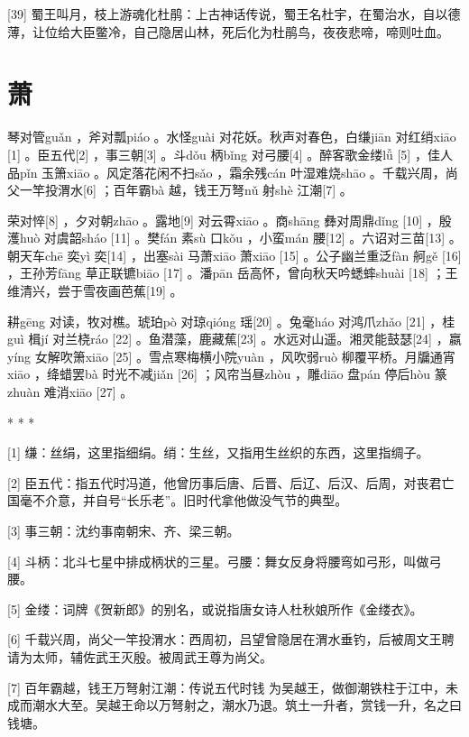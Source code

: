 \documentclass[12pt,UTF8]{ctexbook}
\begin{document}
[39] 蜀王叫月，枝上游魂化杜鹃：上古神话传说，蜀王名杜宇，在蜀治水，自以德薄，让位给大臣鳖冷，自己隐居山林，死后化为杜鹃鸟，夜夜悲啼，啼则吐血。





\chapter{萧}


琴对管guǎn ，斧对瓢piáo 。水怪guài 对花妖。秋声对春色，白缣jiān 对红绡xiāo [1] 。臣五代[2] ，事三朝[3] 。斗dǒu 柄bǐng 对弓腰[4] 。醉客歌金缕lǚ [5] ，佳人品pǐn 玉箫xiāo 。风定落花闲不扫sǎo ，霜余残cán 叶湿难烧shāo 。千载兴周，尚父一竿投渭水[6] ；百年霸bà 越，钱王万弩nǔ 射shè 江潮[7] 。

荣对悴[8] ，夕对朝zhāo 。露地[9] 对云霄xiāo 。商shāng 彝对周鼎dǐng [10] ，殷濩huò 对虞韶sháo [11] 。樊fán 素sù 口kǒu ，小蛮mán 腰[12] 。六诏对三苗[13] 。朝天车chē 奕yì 奕[14] ，出塞sài 马萧xiāo 萧xiāo [15] 。公子幽兰重泛fàn 舸gě [16] ，王孙芳fāng 草正联镳biāo [17] 。潘pān 岳高怀，曾向秋天吟蟋蟀shuài [18] ；王维清兴，尝于雪夜画芭蕉[19] 。

耕gēng 对读，牧对樵。琥珀pò 对琼qióng 瑶[20] 。兔毫háo 对鸿爪zhǎo [21] ，桂guì 楫jí 对兰桡ráo [22] 。鱼潜藻，鹿藏蕉[23] 。水远对山遥。湘灵能鼓瑟[24] ，嬴yíng 女解吹箫xiāo [25] 。雪点寒梅横小院yuàn ，风吹弱ruò 柳覆平桥。月牖通宵xiāo ，绛蜡罢bà 时光不减jiǎn [26] ；风帘当昼zhòu ，雕diāo 盘pán 停后hòu 篆zhuàn 难消xiāo [27] 。



* * *



[1] 缣：丝绢，这里指细绢。绡：生丝，又指用生丝织的东西，这里指绸子。

[2] 臣五代：指五代时冯道，他曾历事后唐、后晋、后辽、后汉、后周，对丧君亡国毫不介意，并自号“长乐老”。旧时代拿他做没气节的典型。

[3] 事三朝：沈约事南朝宋、齐、梁三朝。

[4] 斗柄：北斗七星中排成柄状的三星。弓腰：舞女反身将腰弯如弓形，叫做弓腰。

[5] 金缕：词牌《贺新郎》的别名，或说指唐女诗人杜秋娘所作《金缕衣》。

[6] 千载兴周，尚父一竿投渭水：西周初，吕望曾隐居在渭水垂钓，后被周文王聘请为太师，辅佐武王灭殷。被周武王尊为尚父。

[7] 百年霸越，钱王万弩射江潮：传说五代时钱 为吴越王，做御潮铁柱于江中，未成而潮水大至。吴越王命以万弩射之，潮水乃退。筑土一升者，赏钱一升，名之曰钱塘。
\end{document}
